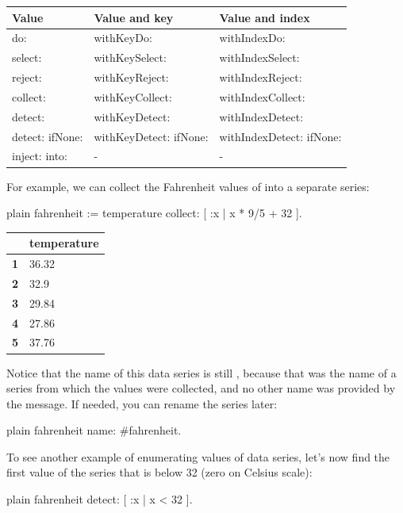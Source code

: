 \documentclass[10pt,twoside,english]{_support/latex/sbabook/sbabook}
\begin{document}
\begin{tabular}{lll}
\toprule
\textbf{Value} & \textbf{Value and key} & \textbf{Value and index} \\
\midrule
do: & withKeyDo: & withIndexDo: \\
select: & withKeySelect: & withIndexSelect: \\
reject: & withKeyReject: & withIndexReject: \\
collect: & withKeyCollect: & withIndexCollect: \\
detect: & withKeyDetect: & withIndexDetect: \\
detect: ifNone: & withKeyDetect: ifNone: & withIndexDetect: ifNone: \\
inject: into: & - & - \\
\bottomrule
\end{tabular}

For example, we can collect the Fahrenheit values of  into a separate series:

\begin{displaycode}{plain}
fahrenheit := temperature collect: [ :x | x * 9/5 + 32 ].
\end{displaycode}

\begin{tabular}{ll}
\toprule
 & \textbf{temperature} \\
\midrule
\textbf{1} & 36.32 \\
\textbf{2} & 32.9 \\
\textbf{3} & 29.84 \\
\textbf{4} & 27.86 \\
\textbf{5} & 37.76 \\
\bottomrule
\end{tabular}

Notice that the name of this data series is still , because that was the name of a series from which the values were collected, and no other name was provided by the  message. If needed, you can rename the  series later:

\begin{displaycode}{plain}
fahrenheit name: #fahrenheit.
\end{displaycode}

To see another example of enumerating values of data series, let's now find the first value of the  series that is below 32 (zero on Celsius scale):

\begin{displaycode}{plain}
fahrenheit detect: [ :x | x < 32 ].
\end{displaycode}
\end{document}
